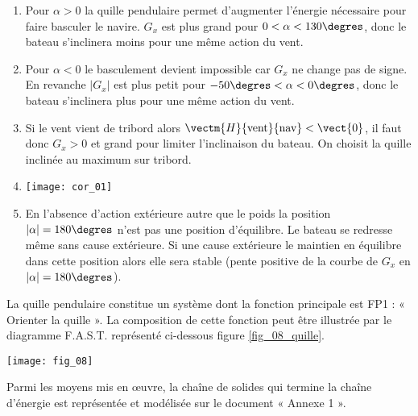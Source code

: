 \begin{corrige}
\begin{enumerate}
\item Pour $\alpha>0$ la quille pendulaire permet d’augmenter l’énergie nécessaire pour faire basculer le navire. $G_x$ est plus grand pour $0<\alpha<130\degres$, donc le bateau s’inclinera moins pour une même action du vent.
\item Pour $\alpha<0$ le basculement devient impossible car $G_x$ ne change pas de signe. En revanche $|G_x|$ est plus petit pour $-50\degres<\alpha<0\degres$, donc le bateau s’inclinera plus pour une même action du vent.
\item Si le vent vient de tribord alors $\vectm{H}{\text{vent}}{\text{nav}}<\vect{0}$, il faut donc $G_x>0$ et grand pour limiter l’inclinaison du bateau. On choisit la quille inclinée au maximum sur tribord.
\item 
\begin{center}
\texttt{[image: cor\_01]}
\end{center}
\item En l’absence d’action extérieure autre que le poids la position $|\alpha|=180\degres$  n’est pas une position d’équilibre. Le bateau se redresse même sans cause extérieure. Si une cause extérieure le maintien en équilibre dans cette position alors elle sera stable (pente positive de la courbe de $G_x$ en $|\alpha|=180\degres$).

\end{enumerate}
\end{corrige}
\else
\fi

\ifprof
\else
\vspace{.5cm}

La quille pendulaire constitue un système dont la fonction principale est FP1 : « Orienter la quille ». La composition de cette fonction peut être illustrée par le diagramme F.A.S.T. représenté ci-dessous figure \ref{fig_08_quille}.
 
\begin{center}
\texttt{[image: fig\_08]}
\end{center}

Parmi les moyens mis en œuvre, la chaîne de solides qui termine la chaîne d’énergie est représentée et modélisée sur le document « Annexe 1 ».

